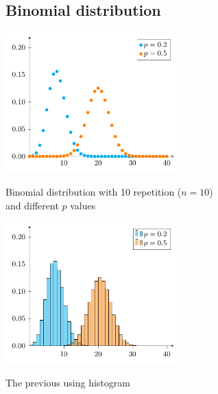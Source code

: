 \documentclass[a4paper]{article}
\begin{document}
	\subsection{Binomial distribution}
		\begin{multicols}{2}
		\centering
		\includegraphics[width=0.5\textwidth]{binomial-distribution}		
		
		Binomial distribution with 10 repetition ($n=10$)\\ and different $p$ values
		\columnbreak
				
		\includegraphics[width=0.5\textwidth]{binomial-distribution-histogram}		
				
		The previous using histogram
		\end{multicols}
	
	\clearpage
\end{document}
